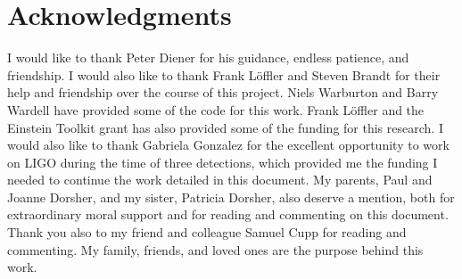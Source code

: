 \documentclass[12pt,letterpaper]{lsuetd}
\begin{document}
\chapter*{Acknowledgments}
\doublespacing
\vspace{0.55ex}
I would like to thank Peter Diener for his guidance, endless patience, and friendship. I would also like to thank Frank L\"{o}ffler and Steven Brandt for their help and friendship over the course of this project. Niels Warburton and Barry Wardell have provided some of the code for this work. Frank L\"{o}ffler and the Einstein Toolkit grant has also provided some of the funding for this research. I would also like to thank Gabriela Gonzalez for the excellent opportunity to work on LIGO during the time of three detections, which provided me the funding I needed to continue the work detailed in this document. My parents, Paul and Joanne Dorsher, and my sister, Patricia Dorsher, also deserve a mention, both for extraordinary moral support and for reading and commenting on this document. Thank you also to my friend and colleague Samuel Cupp for reading and commenting. My family, friends, and loved ones are the purpose behind this work. 

\pagebreak


\singlespacing
\tableofcontents
\pagebreak

\renewcommand\@pnumwidth{1.55em}
\renewcommand\@tocrmarg{8.55em}
\listoftables
\pagebreak
\listoffigures
\pagebreak
\end{document}
